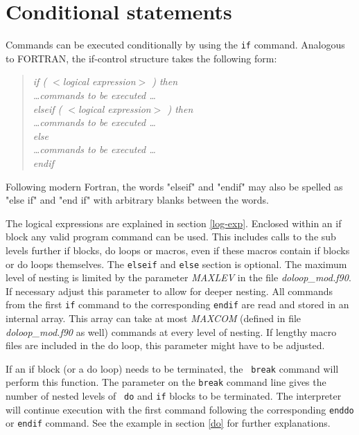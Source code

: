 \section{Conditional statements \label{if}}

Commands can be executed conditionally by using the {\tt if}
command. Analogous to FORTRAN, the if-control structure takes the
following form:

\begin{quote}
{\it if ( $<$logical expression$>$ ) then \\
     \ldots commands to be executed \ldots \\
     elseif ( $<$logical expression$>$ ) then \\
     \ldots commands to be executed \ldots \\
     else \\
     \ldots commands to be executed \ldots \\
     endif }
\end{quote}

Following modern Fortran, the words "elseif" and "endif" may
also be spelled as "else if" and "end if" with arbitrary blanks
between the words.

The logical expressions are explained in section \ref{log-exp}.
Enclosed within an if block any valid program command can be
used.  This includes calls to the sub levels further if blocks, do
loops or macros, even if these macros contain if blocks or do loops
themselves.  The {\tt elseif} and {\tt else} section is optional.
The maximum level of nesting is limited by the parameter {\it
MAXLEV} in the file {\it doloop\_mod.f90}.  If necessary adjust this
parameter to allow for deeper nesting.  All commands from the first
{\tt if} command to the corresponding {\tt endif} are read and
stored in an internal array.  This array can take at most {\it
MAXCOM} (defined in file {\it doloop\_mod.f90} as well) commands at every
level of nesting.  If lengthy macro files are included in the do
loop, this parameter might have to be adjusted.  \par

If an if block (or a do loop) needs to be terminated, the {\tt
break} command will perform this function.  The parameter on the
{\tt break} command line gives the number of nested levels of {\tt
do} and {\tt if} blocks to be terminated. The interpreter will
continue execution with the first command following the
corresponding {\tt enddo} or {\tt endif} command.  See the example
in section \ref{do} for further explanations. \par

